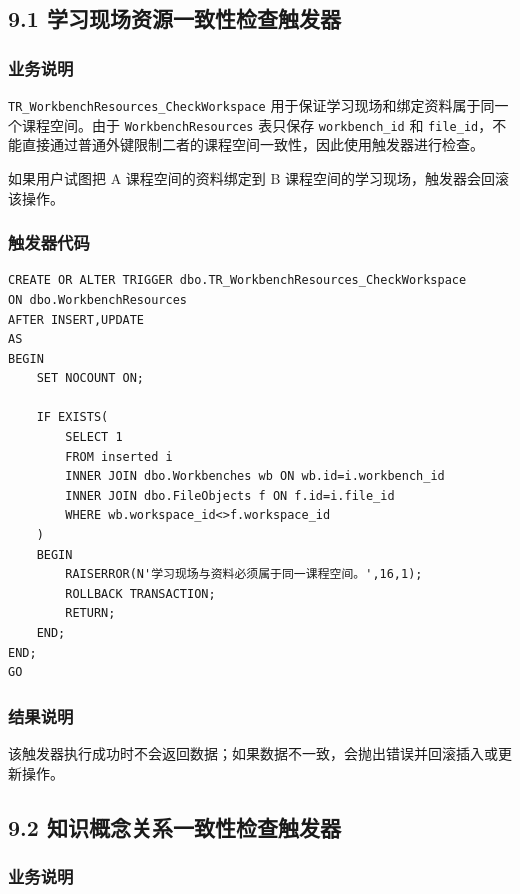 \documentclass[10pt,a4paper,fontset=none]{ctexart}
\begin{document}
\subsection*{9.1 学习现场资源一致性检查触发器}

\subsubsection*{业务说明}

\texttt{TR\_WorkbenchResources\_CheckWorkspace} 用于保证学习现场和绑定资料属于同一个课程空间。由于 \texttt{WorkbenchResources} 表只保存 \texttt{workbench\_id} 和 \texttt{file\_id}，不能直接通过普通外键限制二者的课程空间一致性，因此使用触发器进行检查。\par

如果用户试图把 A 课程空间的资料绑定到 B 课程空间的学习现场，触发器会回滚该操作。\par

\subsubsection*{触发器代码}

\begin{Verbatim}[fontsize=\scriptsize,frame=single]
CREATE OR ALTER TRIGGER dbo.TR_WorkbenchResources_CheckWorkspace
ON dbo.WorkbenchResources
AFTER INSERT,UPDATE
AS
BEGIN
    SET NOCOUNT ON;

    IF EXISTS(
        SELECT 1
        FROM inserted i
        INNER JOIN dbo.Workbenches wb ON wb.id=i.workbench_id
        INNER JOIN dbo.FileObjects f ON f.id=i.file_id
        WHERE wb.workspace_id<>f.workspace_id
    )
    BEGIN
        RAISERROR(N'学习现场与资料必须属于同一课程空间。',16,1);
        ROLLBACK TRANSACTION;
        RETURN;
    END;
END;
GO
\end{Verbatim}

\subsubsection*{结果说明}

该触发器执行成功时不会返回数据；如果数据不一致，会抛出错误并回滚插入或更新操作。\par

\subsection*{9.2 知识概念关系一致性检查触发器}

\subsubsection*{业务说明}
\end{document}
